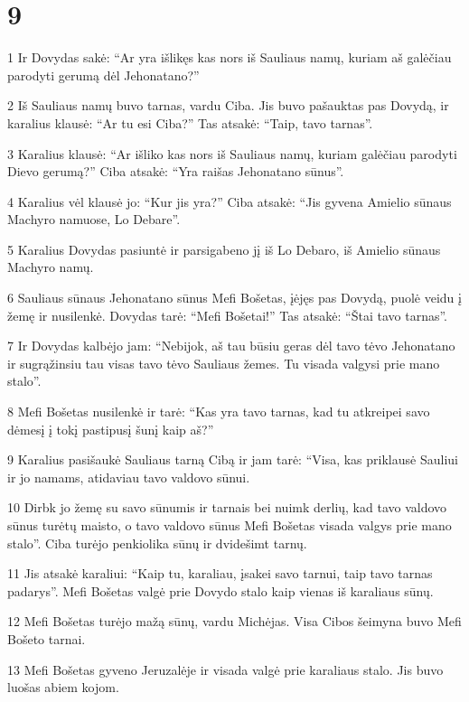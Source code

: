 \chapter{9}


\par 1 Ir Dovydas sakė: “Ar yra išlikęs kas nors iš Sauliaus namų, kuriam aš galėčiau parodyti gerumą dėl Jehonatano?” 
\par 2 Iš Sauliaus namų buvo tarnas, vardu Ciba. Jis buvo pašauktas pas Dovydą, ir karalius klausė: “Ar tu esi Ciba?” Tas atsakė: “Taip, tavo tarnas”. 
\par 3 Karalius klausė: “Ar išliko kas nors iš Sauliaus namų, kuriam galėčiau parodyti Dievo gerumą?” Ciba atsakė: “Yra raišas Jehonatano sūnus”. 
\par 4 Karalius vėl klausė jo: “Kur jis yra?” Ciba atsakė: “Jis gyvena Amielio sūnaus Machyro namuose, Lo Debare”. 
\par 5 Karalius Dovydas pasiuntė ir parsigabeno jį iš Lo Debaro, iš Amielio sūnaus Machyro namų. 
\par 6 Sauliaus sūnaus Jehonatano sūnus Mefi Bošetas, įėjęs pas Dovydą, puolė veidu į žemę ir nusilenkė. Dovydas tarė: “Mefi Bošetai!” Tas atsakė: “Štai tavo tarnas”. 
\par 7 Ir Dovydas kalbėjo jam: “Nebijok, aš tau būsiu geras dėl tavo tėvo Jehonatano ir sugrąžinsiu tau visas tavo tėvo Sauliaus žemes. Tu visada valgysi prie mano stalo”. 
\par 8 Mefi Bošetas nusilenkė ir tarė: “Kas yra tavo tarnas, kad tu atkreipei savo dėmesį į tokį pastipusį šunį kaip aš?” 
\par 9 Karalius pasišaukė Sauliaus tarną Cibą ir jam tarė: “Visa, kas priklausė Sauliui ir jo namams, atidaviau tavo valdovo sūnui. 
\par 10 Dirbk jo žemę su savo sūnumis ir tarnais bei nuimk derlių, kad tavo valdovo sūnus turėtų maisto, o tavo valdovo sūnus Mefi Bošetas visada valgys prie mano stalo”. Ciba turėjo penkiolika sūnų ir dvidešimt tarnų. 
\par 11 Jis atsakė karaliui: “Kaip tu, karaliau, įsakei savo tarnui, taip tavo tarnas padarys”. Mefi Bošetas valgė prie Dovydo stalo kaip vienas iš karaliaus sūnų. 
\par 12 Mefi Bošetas turėjo mažą sūnų, vardu Michėjas. Visa Cibos šeimyna buvo Mefi Bošeto tarnai. 
\par 13 Mefi Bošetas gyveno Jeruzalėje ir visada valgė prie karaliaus stalo. Jis buvo luošas abiem kojom.



